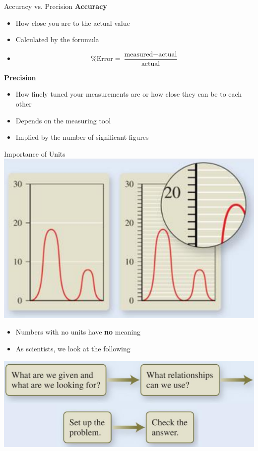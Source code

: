 \documentclass[11pt]{beamer}
\begin{document}
\begin{frame}{Accuracy vs. Precision}
  \textbf{Accuracy}
  \begin{itemize}
  \item How close you are to the actual value
  \item Calculated by the forumula
  \item[] \begin{equation}
    \% \text{Error} = \frac{\text{measured} - \text{actual}}{\text{actual}}
  \end{equation}
  \end{itemize}
  
  \textbf{Precision}
  \begin{itemize}
  \item How finely tuned your measurements are or
    how close they can be to each other
  \item Depends on the measuring tool
  \item Implied by the number of significant figures
  \end{itemize}
\end{frame}

\begin{frame}{Importance of Units}
  \centering
  \includegraphics[scale=0.15]{graph_measure}

  \begin{itemize}
  \item Numbers with no units have \textbf{no}
    meaning
  \item As scientists, we look at the following
  \end{itemize}
  \includegraphics[scale=0.2]{unit_qs}
\end{frame}
\end{document}
